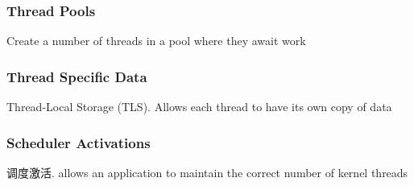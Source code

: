 \subsubsection{Thread Pools}
Create a number of threads in a pool where they await work

\subsubsection{Thread Specific Data}
Thread-Local Storage (TLS). Allows each thread to have its own copy of data

\subsubsection{Scheduler Activations}
调度激活. allows an application to maintain the
correct number of kernel threads